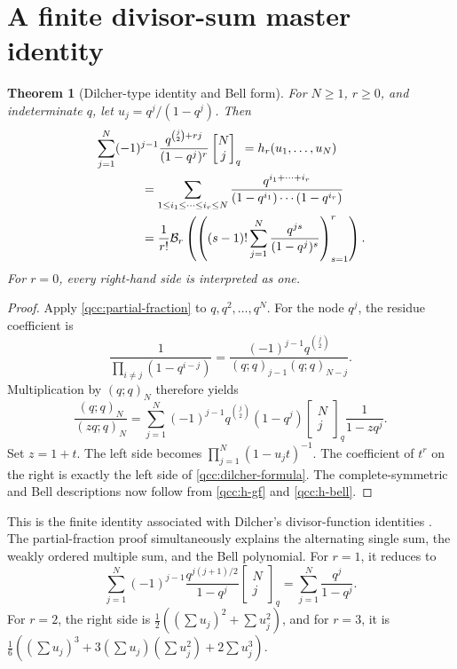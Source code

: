 \documentclass[11pt,a4paper,oneside,openany]{book}
\newtheorem{theorem}{Theorem}[chapter]
\theoremstyle{definition}
\theoremstyle{remark}
\newcommand{\GB}[3][q]{\begin{bmatrix}#2\\#3\end{bmatrix}_{#1}}
\newcommand{\Y}[1]{\mathcal B_{#1}}
\begin{document}
\section{A finite divisor-sum master identity}
\begin{theorem}[Dilcher-type identity and Bell form]\label{qcc:dilcher}
For \(N\ge1\), \(r\ge0\), and indeterminate \(q\), let
\(u_j=q^j/(1-q^j)\). Then
\begin{align}
 &\sum_{j=1}^N(-1)^{j-1}
  \frac{q^{\binom j2+rj}}{(1-q^j)^r}\GB Nj
 =h_r(u_1,\ldots,u_N)\label{qcc:dilcher-formula}\\
 &\hspace{13mm}
 =\sum_{1\le i_1\le\cdots\le i_r\le N}
      \frac{q^{i_1+\cdots+i_r}}{(1-q^{i_1})\cdots(1-q^{i_r})}
 \nonumber\\
 &\hspace{13mm}
 =\frac1{r!}\Y r\left(
       \left((s-1)!\sum_{j=1}^N\frac{q^{js}}{(1-q^j)^s}\right)_{s=1}^r
       \right).
 \label{qcc:dilcher-bell}
\end{align}
For \(r=0\), every right-hand side is interpreted as one.
\end{theorem}
\begin{proof}
Apply \cref{qcc:partial-fraction} to \(q,q^2,\ldots,q^N\). For the node
\(q^j\), the residue coefficient is
\[
 \frac1{\prod_{i\ne j}(1-q^{i-j})}
 =\frac{(-1)^{j-1}q^{\binom j2}}{(q;q)_{j-1}(q;q)_{N-j}}.
\]
Multiplication by \((q;q)_N\) therefore yields
\begin{equation}\label{qcc:divisor-rational}
 \frac{(q;q)_N}{(zq;q)_N}
 =\sum_{j=1}^N(-1)^{j-1}q^{\binom j2}(1-q^j)\GB Nj\frac1{1-zq^j}.
\end{equation}
Set \(z=1+t\). The left side becomes
\(\prod_{j=1}^N(1-u_jt)^{-1}\).
The coefficient of \(t^r\) on the right is exactly the left side of
\eqref{qcc:dilcher-formula}. The complete-symmetric and Bell descriptions now
follow from \eqref{qcc:h-gf} and \eqref{qcc:h-bell}.
\end{proof}
This is the finite identity associated with Dilcher's divisor-function
identities \cite{dilcher}. The partial-fraction proof simultaneously explains the
alternating single sum, the weakly ordered multiple sum, and the Bell polynomial.
For \(r=1\), it reduces to
\[
 \sum_{j=1}^N(-1)^{j-1}\frac{q^{j(j+1)/2}}{1-q^j}\GB Nj
 =\sum_{j=1}^N\frac{q^j}{1-q^j}.
\]
For \(r=2\), the right side is \(\frac12((\sum u_j)^2+\sum u_j^2)\),
and for \(r=3\), it is
\(\frac16((\sum u_j)^3+3(\sum u_j)(\sum u_j^2)+2\sum u_j^3)\).
\end{document}
